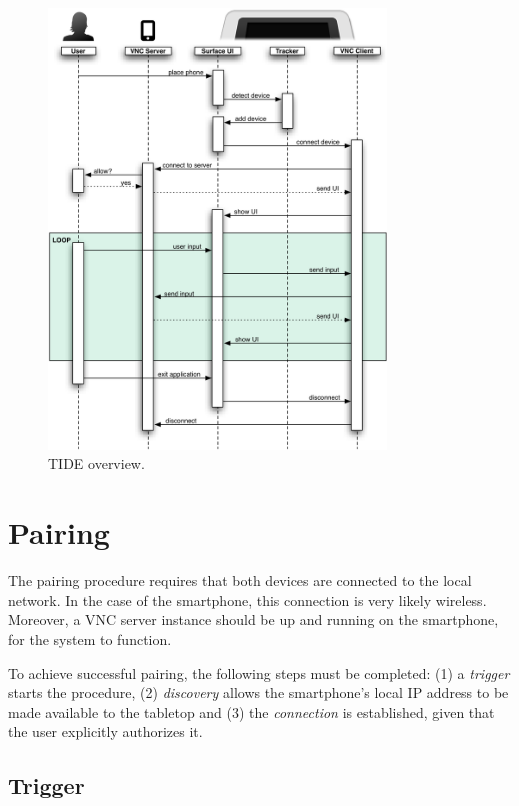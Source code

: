 \begin{figure}[h!]
  \centering
    \includegraphics[width=0.8\textwidth]{images/sequenceOverview}
    \caption{TIDE overview.}
    \label{fig:sequenceOverview}
\end{figure}

\section{Pairing}
\label{sec:pairing}

The pairing procedure requires that both devices are connected to the local network.
In the case of the smartphone, this connection is very likely wireless.
Moreover, a VNC server instance should be up and running on the smartphone, for the system to function.

To achieve successful pairing, the following steps must be completed:
(1) a \emph{trigger} starts the procedure,
(2) \emph{discovery} allows the smartphone's local IP address to be made available to the tabletop and
(3) the \emph{connection} is established, given that the user explicitly authorizes it.

\subsection{Trigger}

